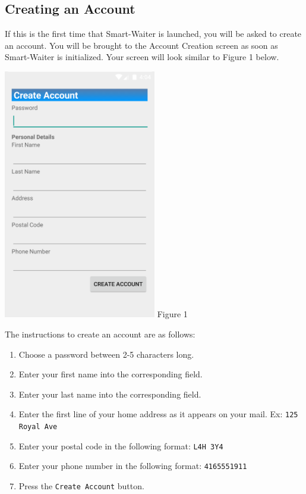 \documentclass[12pt, titlepage]{article}
\begin{document}
\subsection{Creating an Account}
If this is the first time that Smart-Waiter is launched, you will be asked to create an account. You will be brought to the Account Creation screen as soon as Smart-Waiter is initialized. Your screen will look similar to Figure 1 below. 

\begin{center}
\includegraphics[width=0.5\textwidth]{accountCreation.png}
\linebreak Figure 1
\end{center}

The instructions to create an account are as follows: 
\begin{enumerate}
	\item Choose a password between 2-5 characters long.
	\item Enter your first name into the corresponding field.
	\item Enter your last name into the corresponding field.
	\item Enter the first line of your home address as it appears on your mail. Ex: \texttt{125 Royal Ave}
	\item Enter your postal code in the following format: \texttt{L4H 3Y4}
	\item Enter your phone number in the following format: \texttt{4165551911}
	\item Press the \texttt{Create Account} button.
\end{enumerate}
\end{document}
